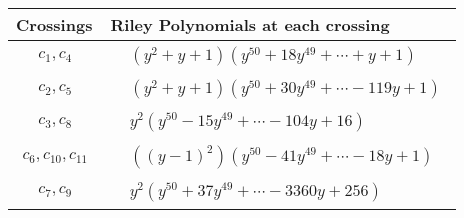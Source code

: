 \documentclass[1p]{elsarticle_modified}
\theoremstyle{definition}
\begin{document}
\begin{tabular}{m{50pt}|m{274pt}}
Crossings & \hspace{64pt}Riley Polynomials at each crossing \\
\hline $$\begin{aligned}c_{1},c_{4}\end{aligned}$$&$\begin{aligned}
&(y^2+y+1)(y^{50}+18 y^{49}+\cdots+y+1)
\end{aligned}$\\
\hline $$\begin{aligned}c_{2},c_{5}\end{aligned}$$&$\begin{aligned}
&(y^2+y+1)(y^{50}+30 y^{49}+\cdots-119 y+1)
\end{aligned}$\\
\hline $$\begin{aligned}c_{3},c_{8}\end{aligned}$$&$\begin{aligned}
&y^2(y^{50}-15 y^{49}+\cdots-104 y+16)
\end{aligned}$\\
\hline $$\begin{aligned}c_{6},c_{10},c_{11}\end{aligned}$$&$\begin{aligned}
&((y-1)^2)(y^{50}-41 y^{49}+\cdots-18 y+1)
\end{aligned}$\\
\hline $$\begin{aligned}c_{7},c_{9}\end{aligned}$$&$\begin{aligned}
&y^2(y^{50}+37 y^{49}+\cdots-3360 y+256)
\end{aligned}$\\
\hline
\end{tabular}
\vskip 2pc
\end{document}
